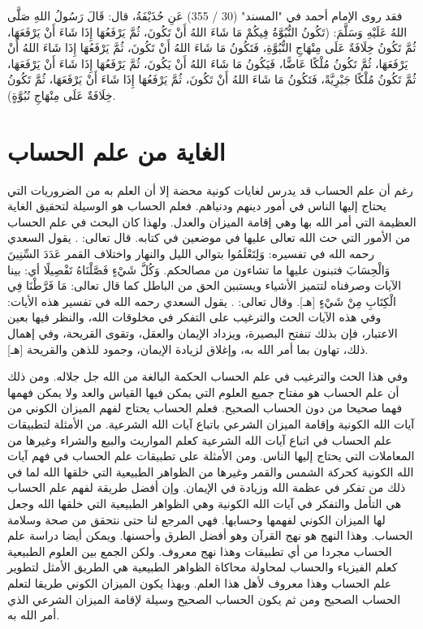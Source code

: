 فقد روى الإمام أحمد في "المسند" (30 / 355) عَنِ حُذَيْفَةُ، قال: قَالَ رَسُولُ اللهِ صَلَّى اللهُ عَلَيْهِ وَسَلَّمَ: (تَكُونُ النُّبُوَّةُ فِيكُمْ مَا شَاءَ اللهُ أَنْ تَكُونَ، ثُمَّ يَرْفَعُهَا إِذَا شَاءَ أَنْ يَرْفَعَهَا، ثُمَّ تَكُونُ خِلَافَةٌ عَلَى مِنْهَاجِ النُّبُوَّةِ، فَتَكُونُ مَا شَاءَ اللهُ أَنْ تَكُونَ، ثُمَّ يَرْفَعُهَا إِذَا شَاءَ اللهُ أَنْ يَرْفَعَهَا، ثُمَّ تَكُونُ مُلْكًا عَاضًّا، فَيَكُونُ مَا شَاءَ اللهُ أَنْ يَكُونَ، ثُمَّ يَرْفَعُهَا إِذَا شَاءَ أَنْ يَرْفَعَهَا، ثُمَّ تَكُونُ مُلْكًا جَبْرِيَّةً، فَتَكُونُ مَا شَاءَ اللهُ أَنْ تَكُونَ، ثُمَّ يَرْفَعُهَا إِذَا شَاءَ أَنْ يَرْفَعَهَا، ثُمَّ تَكُونُ خِلَافَةٌ عَلَى مِنْهَاجِ نُبُوَّةٍ).


\section{الغاية من علم الحساب}

رغم أن علم الحساب قد يدرس لغايات كونية محضة إلا أن العلم به من الضروريات التي يحتاج إليها الناس في أمور دينهم ودنياهم. فعلم الحساب هو الوسيلة لتحقيق الغاية العظيمة التي أمر الله بها وهي إقامة الميزان والعدل. ولهذا كان البحث في علم الحساب من الأمور التي حث الله تعالى عليها في موضعين في كتابه. قال تعالى: \quranayah*[17][12]{\footnotesize \surahname*[17]}.
يقول السعدي رحمه الله في تفسيره:
{ وَلِتَعْلَمُوا } بتوالي الليل والنهار واختلاف القمر { عَدَدَ السِّنِينَ وَالْحِسَابَ } فتبنون عليها ما تشاءون من مصالحكم. { وَكُلَّ شَيْءٍ فَصَّلْنَاهُ تَفْصِيلًا } أي: بينا الآيات وصرفناه لتتميز الأشياء ويستبين الحق من الباطل كما قال تعالى: { مَا فَرَّطْنَا فِي الْكِتَابِ مِنْ شَيْءٍ }
[هـ]. وقال تعالى: \quranayah*[10][5]{\footnotesize \surahname*[10]}.
يقول السعدي رحمه الله في تفسير هذه الأيات:
وفي هذه الآيات الحث والترغيب على التفكر في مخلوقات الله، والنظر فيها بعين الاعتبار، فإن بذلك تنفتح البصيرة، ويزداد الإيمان والعقل، وتقوى القريحة، وفي إهمال ذلك، تهاون بما أمر الله به، وإغلاق لزيادة الإيمان، وجمود للذهن والقريحة
[هـ].

وفي هذا الحث والترغيب في علم الحساب الحكمة البالغة من الله جل جلاله. ومن ذلك أن علم الحساب هو مفتاح جميع العلوم التي يمكن فيها القياس والعد ولا يمكن فهمها فهما صحيحا من دون الحساب الصحيح. فعلم الحساب يحتاج لفهم الميزان الكوني من آيات الله الكونية وإقامة الميزان الشرعي باتباع آيات الله الشرعية. من الأمثلة لتطبيقات علم الحساب في اتباع آيات الله الشرعية كعلم المواريث والبيع والشراء وغيرها من المعاملات التي يحتاج إليها الناس.  ومن الأمثلة على تطبيقات علم الحساب في فهم آيات الله الكونية كحركة الشمس والقمر وغيرها من الظواهر الطبيعية التي خلقها الله لما في ذلك من تفكر في عظمة الله وزيادة في الإيمان. وإن أفضل طريقة لفهم علم الحساب هي التأمل والتفكر في آيات الله الكونية وهي الظواهر الطبيعية التي خلقها الله وجعل لها الميزان الكوني لفهمها وحسابها. فهي المرجع لنا حتى نتحقق من صحة وسلامة الحساب. وهذا النهج هو نهج القرآن وهو أفضل الطرق وأحسنها. ويمكن أيضا دراسة علم الحساب مجردا من أي تطبيقات وهذا نهج معروف. ولكن الجمع بين العلوم الطبيعية كعلم الفيزياء والحساب لمحاولة محاكاة الظواهر الطبيعية هي الطريق الأمثل لتطوير علم الحساب وهذا معروف لأهل هذا العلم. وبهذا يكون الميزان الكوني طريقا لتعلم الحساب الصحيح ومن ثم يكون الحساب الصحيح وسيلة لإقامة الميزان الشرعي الذي أمر الله به.

